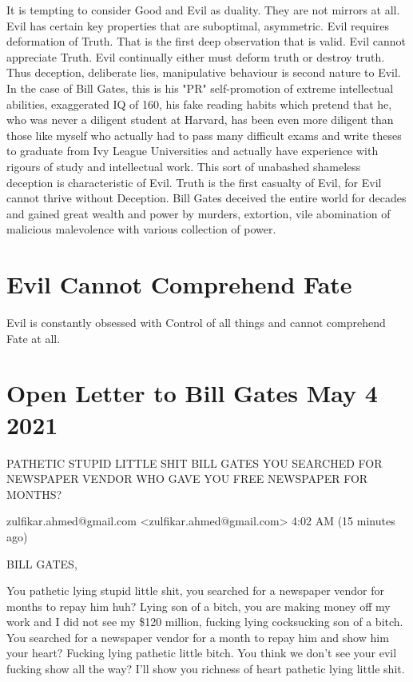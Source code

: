 \documentclass{amsart}
\begin{document}
It is tempting to consider Good and Evil as duality.  They are not mirrors at all.  Evil has certain key properties that are suboptimal, asymmetric.  Evil requires deformation of Truth.  That is the first deep observation that is valid.  Evil cannot appreciate Truth.  Evil continually either must deform truth or destroy truth.  Thus deception, deliberate lies, manipulative behaviour is second nature to Evil.  In the case of Bill Gates, this is his "PR" self-promotion of extreme intellectual abilities, exaggerated IQ of 160, his fake reading habits which pretend that he, who was never a diligent student at Harvard, has been even more diligent than those like myself who actually had to pass many difficult exams and write theses to graduate from Ivy League Universities and actually have experience with rigours of study and intellectual work.  This sort of unabashed shameless deception is characteristic of Evil.  Truth is the first casualty of Evil, for Evil cannot thrive without Deception.  Bill Gates deceived the entire world for decades and gained great wealth and power by murders, extortion, vile abomination of malicious malevolence with various collection of power.

\section{Evil Cannot Comprehend Fate}

Evil is constantly obsessed with Control of all things and cannot comprehend Fate at all.

\section{Open Letter to Bill Gates May 4 2021}

PATHETIC STUPID LITTLE SHIT BILL GATES YOU SEARCHED FOR NEWSPAPER VENDOR WHO GAVE YOU FREE NEWSPAPER FOR MONTHS?

zulfikar.ahmed@gmail.com <zulfikar.ahmed@gmail.com>
4:02 AM (15 minutes ago)


BILL GATES,

You pathetic lying stupid little shit, you searched for a newspaper vendor for months to repay him huh?  Lying son of a bitch, you are making money off my work and I did not see my \$120 million, fucking lying cocksucking son of a bitch.  You searched for a newspaper vendor for a month to repay him and show him your heart?  Fucking lying pathetic little bitch.  You think we don't see your evil fucking show all the way?  I'll show you richness  of heart pathetic lying little shit.
\end{document}
